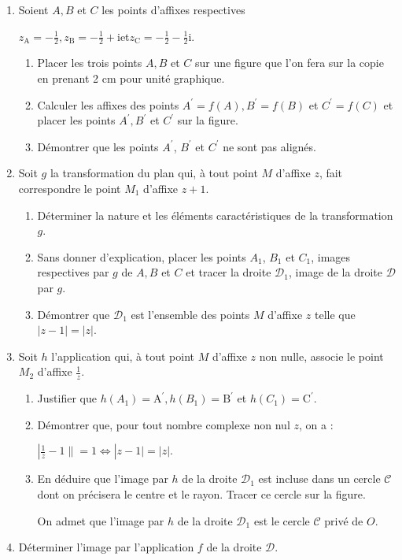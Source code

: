 \begin{enumerate}
     \item
     Soient $A, B$ et $C$ les points d'affixes respectives
     \par
     $z_{\text{A}}=-\frac{1}{2},   z_{\text{B}}=-\frac{1}{2}+\text{i} $et$   z_{\text{C}}=-\frac{1}{2}-\frac{1}{2} \text{i}.$
     \begin{enumerate}[label=\alph*.]
          \item
          Placer les trois points $A, B$ et $C$ sur une figure que l'on fera sur la copie en prenant 2 cm pour unité graphique.
          \item
          Calculer les affixes des points $A^{\prime} = f\left(A\right),  B^{\prime} = f\left(B\right)$ et $C^{\prime} = f\left(C\right)$ et placer les points $A^{\prime}, B^{\prime}$ et $C^{\prime}$ sur la figure.
          \item
          Démontrer que les points $A^{\prime}$, $B^{\prime}$ et $C^{\prime}$ ne sont pas alignés.
     \end{enumerate}
     \item
     Soit $g$ la transformation du plan qui, à tout point $M$ d'affixe $z$, fait correspondre le point $M_{1}$ d'affixe $z + 1$.
     \begin{enumerate}[label=\alph*.]
          \item
          Déterminer la nature et les éléments caractéristiques de la transformation $g$.
          \item
          Sans donner d'explication, placer les points $A_{1}$, $B_{1}$ et $C_{1}$, images respectives par $g$ de $A, B$ et $C$ et tracer la droite $\mathscr D_{1}$, image de la droite $\mathscr D$ par $g$.
          \item
          Démontrer que $\mathscr D_{1}$ est l'ensemble des points $M$ d'affixe $z$ telle que $|z-1| = |z|$.
     \end{enumerate}
     \item
     Soit $h$ l'application qui, à tout point $M$ d'affixe $z$ non nulle, associe le point $M_{2}$ d'affixe $\frac{1}{z}$.
     \begin{enumerate}[label=\alph*.]
          \item
          Justifier que $h\left(A_{1}\right) = \text{A}^{\prime}, h\left(B_{1}\right) = \text{B}^{\prime}$ et $h \left(C_{1}\right) = \text{C}^{\prime}$.
          \item
          Démontrer que, pour tout nombre complexe non nul $z$, on a :
          \par
          $ |\frac{1}{z}-1\| = 1 \Leftrightarrow   |z-1| = |z|.$
          \item
          En déduire que l'image par $h$ de la droite $\mathscr D_{1}$ est incluse dans un cercle $\mathscr C$ dont on précisera le centre et le rayon. Tracer ce cercle sur la figure.
          \par
          On admet que l'image par $h$ de la droite $\mathscr D_{1}$ est le cercle $\mathscr C$ privé de $O$.
     \end{enumerate}
     \item
     Déterminer l'image par l'application $f$ de la droite $\mathscr D$.
\end{enumerate}
